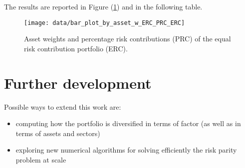 \documentclass[12pt, a4paper]{article}
\theoremstyle{problemstyle}
\begin{document}
The results are reported in Figure (\ref{fig:histo_ERC}) and in the following table.
\begin{figure}[H]
	\centering
	\texttt{[image: data/bar\_plot\_by\_asset\_w\_ERC\_PRC\_ERC]}
	\caption{Asset weights and percentage risk contributions (PRC) of the equal risk contribution portfolio (ERC).}
	\label{fig:histo_ERC}
\end{figure}

\centering


\section{Further development}
Possible ways to extend this work are:
\begin{itemize}
	\item computing how the portfolio is diversified in terms of factor \cite{risk_parity} (as well as in terms of assets and sectors)
	\item exploring new numerical algorithms for solving efficiently the risk parity problem at scale \cite{iterative_meth}
\end{itemize} 
\nocite{*}


\end{document}
